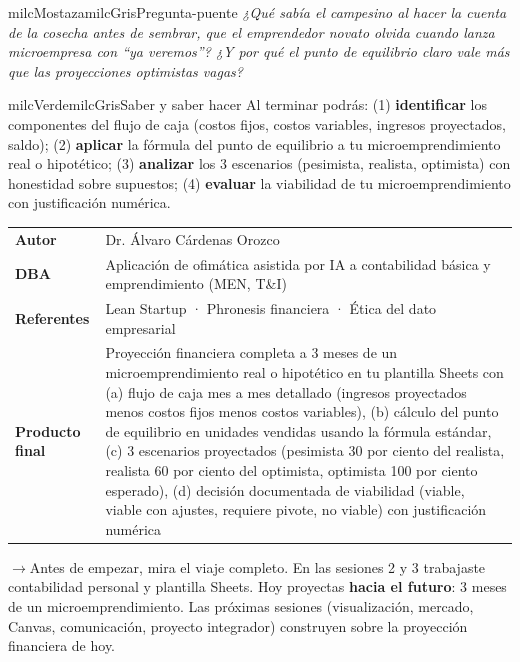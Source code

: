 \documentclass[11pt,letterpaper]{article}
\newcommand{\puente}[1]{%
  \begin{puentebox}%
    \textcolor{milcGradeDark}{$\rightarrow$}\hspace{2mm}#1%
  \end{puentebox}%
}
\begin{document}
\begin{softbox}{milcMostaza}{milcGris}{Pregunta-puente}
\textit{¿Qué sabía el campesino al hacer la cuenta de la cosecha antes de sembrar, que el emprendedor novato olvida cuando lanza microempresa con \emph{``ya veremos''}? ¿Y por qué el punto de equilibrio claro vale más que las proyecciones optimistas vagas?}
\end{softbox}

\begin{softbox}{milcVerde}{milcGris}{Saber y saber hacer}
Al terminar podrás: (1) \textbf{identificar} los componentes del flujo de caja (costos fijos, costos variables, ingresos proyectados, saldo); (2) \textbf{aplicar} la fórmula del punto de equilibrio a tu microemprendimiento real o hipotético; (3) \textbf{analizar} los 3 escenarios (pesimista, realista, optimista) con honestidad sobre supuestos; (4) \textbf{evaluar} la viabilidad de tu microemprendimiento con justificación numérica.
\end{softbox}



\small
\begin{tabularx}{\textwidth}{>{\bfseries}p{3.0cm}Y}
Autor & Dr. Álvaro Cárdenas Orozco\\
DBA & Aplicación de ofimática asistida por IA a contabilidad básica y emprendimiento (MEN, T\&I)\\
Referentes & Lean Startup · Phronesis financiera · Ética del dato empresarial\\
Producto final & Proyección financiera completa a 3 meses de un microemprendimiento real o hipotético en tu plantilla Sheets con (a) flujo de caja mes a mes detallado (ingresos proyectados menos costos fijos menos costos variables), (b) cálculo del punto de equilibrio en unidades vendidas usando la fórmula estándar, (c) 3 escenarios proyectados (pesimista 30 por ciento del realista, realista 60 por ciento del optimista, optimista 100 por ciento esperado), (d) decisión documentada de viabilidad (viable, viable con ajustes, requiere pivote, no viable) con justificación numérica\\
\end{tabularx}
\normalsize

\puente{Antes de empezar, mira el viaje completo. En las sesiones 2 y 3 trabajaste contabilidad personal y plantilla Sheets. Hoy proyectas \textbf{hacia el futuro}: 3 meses de un microemprendimiento. Las próximas sesiones (visualización, mercado, Canvas, comunicación, proyecto integrador) construyen sobre la proyección financiera de hoy.}
\end{document}
